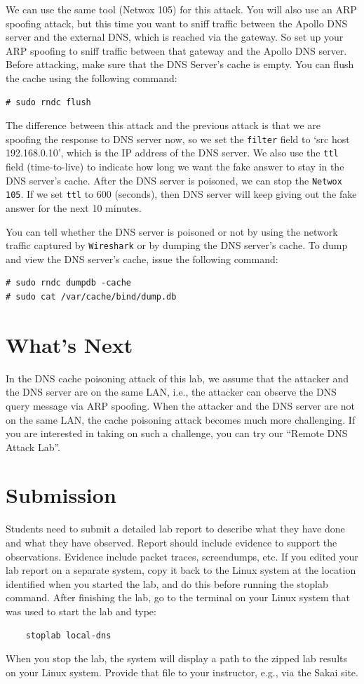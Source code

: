 We can use the same tool (Netwox 105) for this attack. 
You will also use an ARP spoofing attack, but this time
you want to sniff traffic between the Apollo DNS server and the 
external DNS, which is reached via the gateway.  So set up your
ARP spoofing to sniff traffic between that gateway and the
Apollo DNS server.
Before attacking, 
make sure that the DNS Server's cache is empty. 
You can flush the cache using the following command:
\begin{verbatim}
# sudo rndc flush
\end{verbatim}

The difference between this attack and the previous attack is that 
we are spoofing the response to
DNS server now, so we set the {\tt filter} field to `src host 192.168.0.10', 
which is the IP address of the DNS server.
We also use the {\tt ttl} field (time-to-live) 
to indicate how long we want the fake answer to 
stay in the DNS server's cache.  After the DNS server is poisoned, we can stop 
the {\tt Netwox 105}. If we set {\tt ttl} to 600 (seconds), then DNS server will keep 
giving out the fake answer for the next 10 minutes.

You can tell whether the DNS server is poisoned or not by using the network 
traffic captured by {\tt Wireshark} or by
dumping the DNS server's cache. To dump and view the DNS server's cache, issue
the following command:
\begin{verbatim}
# sudo rndc dumpdb -cache
# sudo cat /var/cache/bind/dump.db
\end{verbatim}


\section{What's Next}


In the DNS cache poisoning attack of this lab, 
we assume that the attacker and the DNS server are on
the same LAN, i.e., the attacker can observe the DNS query message
via ARP spoofing.
When the attacker and the DNS server are not on the same LAN,
the cache poisoning attack becomes much more challenging. If you
are interested in taking on such a challenge, you can 
try our ``Remote DNS Attack Lab''.


\section{Submission}

Students need to submit a detailed lab report to describe what they have done and
what they have observed. Report should include evidence to support 
the observations. Evidence include packet traces, screendumps, etc.
If you edited your lab report on a separate system, copy it back to the Linux system at the location
identified when you started the lab, and do this before running the stoplab command.
After finishing the lab, go to the terminal on your Linux system that was used to start the lab and type:
\begin{verbatim}
    stoplab local-dns
\end{verbatim}
When you stop the lab, the system will display a path to the zipped lab results on your Linux system.  Provide that file to
your instructor, e.g., via the Sakai site.

